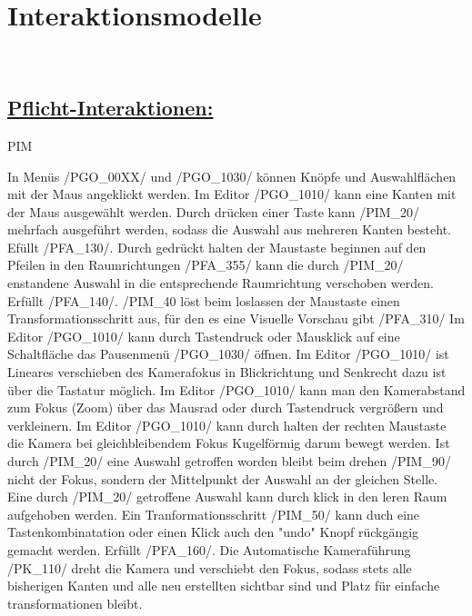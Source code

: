 %
%


%
%
\clearpage


\section{Interaktionsmodelle}
\label{NU:Interaktion}~\\


\subsection*{\underline{Pflicht-Interaktionen:}}

\begin{ids}{\gls{PIM}}

	\id[10] In Menüs /PGO\_00XX/ und /PGO\_1030/ können Knöpfe und Auswahlflächen mit der Maus angeklickt werden.
	\id[20] Im Editor /PGO\_1010/ kann eine Kanten mit der Maus ausgewählt werden.
	\id[30] Durch drücken einer Taste kann /PIM\_20/ mehrfach ausgeführt werden, sodass die Auswahl aus mehreren Kanten besteht. Efüllt /PFA\_130/.
	\id[40] Durch gedrückt halten der Maustaste beginnen auf den Pfeilen in den Raumrichtungen /PFA\_355/ kann die durch /PIM\_20/ enstandene Auswahl in die entsprechende Raumrichtung verschoben werden. Erfüllt /PFA\_140/.
	\id[50] /PIM\_40 löst beim loslassen der Maustaste einen Transformationsschritt aus, für den es eine Visuelle Vorschau gibt /PFA\_310/
	\id[60] Im Editor /PGO\_1010/ kann durch Tastendruck oder Mausklick auf eine Schaltfläche das Pausenmenü /PGO\_1030/ öffnen.
	\id[70] Im Editor /PGO\_1010/ ist Lineares verschieben des Kamerafokus in Blickrichtung und Senkrecht dazu ist über die Tastatur möglich.
	\id[80] Im Editor /PGO\_1010/ kann man den Kamerabstand zum Fokus (Zoom) über das Mausrad oder durch Tastendruck vergrößern und verkleinern.
	\id[90] Im Editor /PGO\_1010/ kann durch halten der rechten Maustaste die Kamera bei gleichbleibendem Fokus Kugelförmig darum bewegt werden.
	\id[100] Ist durch /PIM\_20/ eine Auswahl getroffen worden bleibt beim drehen /PIM\_90/ nicht der Fokus, sondern der Mittelpunkt der Auswahl an der gleichen Stelle.
	\id[110] Eine durch /PIM\_20/ getroffene Auswahl kann durch klick in den leren Raum aufgehoben werden.
	\id[120] Ein Tranformationsschritt /PIM\_50/ kann duch eine Tastenkombinatation oder einen Klick auch den "undo" Knopf rückgängig gemacht werden. Erfüllt /PFA\_160/.
	\id[130] Die Automatische Kameraführung /PK\_110/ dreht die Kamera und verschiebt den Fokus, sodass stets alle bisherigen Kanten und alle neu erstellten sichtbar sind und Platz für einfache transformationen bleibt.

\end{ids}


